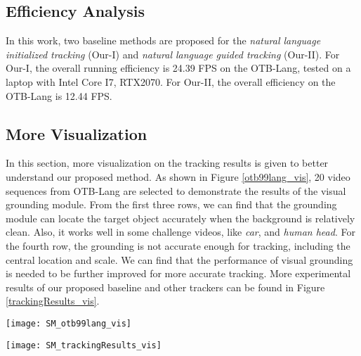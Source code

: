 \documentclass[final]{cvpr}
\begin{document}
\subsection{Efficiency Analysis} 
In this work, two baseline methods are proposed for the \emph{natural language initialized tracking} (Our-I) and \emph{natural language guided tracking} (Our-II). 
For Our-I, the overall running efficiency is 24.39 FPS on the OTB-Lang, tested on a laptop with Intel Core I7, RTX2070.  
For Our-II, the overall efficiency on the OTB-Lang is 12.44 FPS. 









\subsection{More Visualization } 

In this section, more visualization on the tracking results is given to better understand our proposed method. As shown in Figure \ref{otb99lang_vis}, 20 video sequences from OTB-Lang are selected to demonstrate the results of the visual grounding module. From the first three rows, we can find that the grounding module can locate the target object accurately when the background is relatively clean. Also, it works well in some challenge videos, like \emph{car}, and \emph{human head}. For the fourth row, the grounding is not accurate enough for tracking, including the central location and scale. We can find that the performance of visual grounding is needed to be further improved for more accurate tracking. More experimental results of our proposed baseline and other trackers can be found in Figure \ref{trackingResults_vis}. 


\begin{figure*}[!htb]
\center
\texttt{[image: SM\_otb99lang\_vis]}
\caption{Results of the first frame of visual grounding module. }
\label{otb99lang_vis}
\end{figure*} 	


\begin{figure*}[!htb]
\center
\texttt{[image: SM\_trackingResults\_vis]}
\caption{Tracking results of our method and other state-of-the-art tracking algorithms. } 
\label{trackingResults_vis}
\end{figure*} 	



 



 
 
 
 
\end{document}

